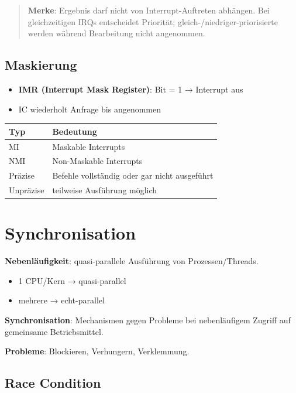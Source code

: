 \documentclass[11pt, a4paper]{article}
\begin{document}
\begin{quote}
\textbf{Merke}: Ergebnis darf nicht von Interrupt-Auftreten abhängen. Bei gleichzeitigen IRQs entscheidet Priorität; gleich-/niedriger-priorisierte werden während Bearbeitung nicht angenommen.
\end{quote}


\subsection{Maskierung}
\begin{itemize}
  \item \textbf{IMR (Interrupt Mask Register)}: Bit = 1 → Interrupt aus
  \item IC wiederholt Anfrage bis angenommen
\end{itemize}


{\small
\begin{tabularx}{\linewidth}{XX}
\hline
\rowcolor{tableheadbg}
{\color{white}\textbf{Typ}} & {\color{white}\textbf{Bedeutung}} \\[2pt]
\hline
\endhead
\hline
\endfoot
MI & Maskable Interrupts \\
NMI & Non-Maskable Interrupts \\
Präzise & Befehle vollständig oder gar nicht ausgeführt \\
Unpräzise & teilweise Ausführung möglich \\
\end{tabularx}
}



\section{Synchronisation}

\textbf{Nebenläufigkeit}: quasi-parallele Ausführung von Prozessen/Threads.

\begin{itemize}
  \item 1 CPU/Kern → quasi-parallel
  \item mehrere → echt-parallel
\end{itemize}

\textbf{Synchronisation}: Mechanismen gegen Probleme bei nebenläufigem Zugriff auf gemeinsame Betriebsmittel.


\textbf{Probleme}: Blockieren, Verhungern, Verklemmung.



\subsection{Race Condition}
\end{document}
